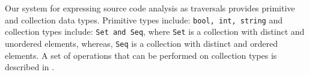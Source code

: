 
% 
% 
% 


Our system for expressing source code analysis as traversals provides primitive and
collection data types. Primitive types include: \lstinline|bool, int, string|
and collection types include: \lstinline|Set and Seq|, where \lstinline|Set| is a
collection with distinct and unordered elements, whereas, \lstinline|Seq| is a
collection with distinct and ordered elements. A set of operations that can be
performed on collection types is described in .
% 

